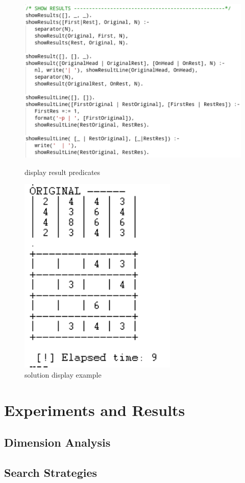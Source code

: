 \documentclass[runningheads]{llncs}
\begin{document}
\begin{figure}[h]
\includegraphics[scale=0.5]{showResults}
\centering
\caption{display result predicates}
\centering
\vspace{5mm}	
\includegraphics[scale=1]{solutionDisplay}
\centering
\caption{solution display example}
\centering
\end{figure}

\section{Experiments and Results}
\subsection{Dimension Analysis}
\subsection{Search Strategies}
\end{document}
